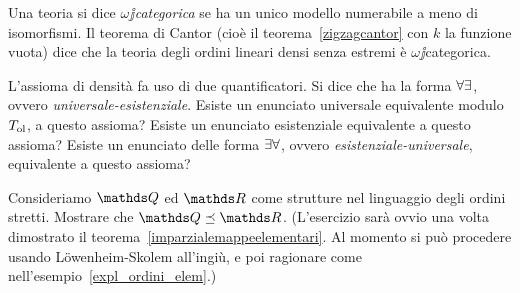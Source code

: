 \begin{comment}
% 
% 
% 
% 
% 
% 
\end{comment}

Una teoria si dice \emph{$\omega\jj$categorica\/} se ha un unico modello numerabile a meno di isomorfismi. Il teorema di Cantor (cio\`e il teorema~\ref{zigzagcantor} con $k$ la funzione vuota) dice che la teoria degli ordini lineari densi senza estremi \`e $\omega\jj$categorica. 

\begin{exercise}
L'assioma di densit\`a  fa uso di due quantificatori. Si dice che ha la forma \emph{$\forall\exists$}, ovvero \emph{universale-esistenziale}. Esiste un enunciato universale equivalente modulo $T_{\rm ol}$, a questo assioma? Esiste un enunciato esistenziale equivalente a questo assioma? Esiste un enunciato delle forma \emph{$\exists\forall$}, ovvero \emph{esistenziale-universale}, equivalente a questo assioma?\QED
\end{exercise}

\begin{exercise}
Consideriamo $\QQ$ ed $\RR$ come strutture nel linguaggio degli ordini stretti. Mostrare che $\QQ\preceq \RR$. (L'esercizio sar\`a ovvio una volta dimostrato il teorema~\ref{imparzialemappeelementari}. Al momento si pu\`o procedere usando L\"owenheim-Skolem all'ingi\`u, e poi ragionare come nell'esempio~\ref{expl_ordini_elem}.)\QED
\end{exercise}

